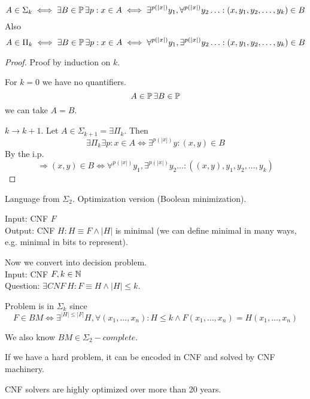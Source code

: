 \begin{definition}\label{ph_altern}
	\[ A \in \Sigma_k \iff \exists B \in \operatorname{\mathbb{P}} \exists p: x \in A \iff \exists^{p(|x|)} y_1, \forall^{p(|x|)} y_2 \ldots : (x, y_1, y_2, \ldots, y_k) \in B \]
	Also
	\[ A \in \Pi_k \iff \exists B \in \operatorname{\mathbb{P}} \exists p: x \in A \iff \forall^{p(|x|)} y_1, \exists^{p(|x|)} y_2 \ldots : (x, y_1, y_2, \ldots, y_k) \in B \]
\end{definition}
\begin{proof}
	Proof by induction on $k$.

	For $k = 0$ we have no quantifiers.
	\[ A \in \operatorname{\mathbb{P}} \exists B \in \operatorname{\mathbb{P}} \]
	we can take $A = B$.

	$k \to k + 1$. Let $A \in \Sigma_{k + 1} = \exists \Pi_k$.
	Then
	\[ \exists \Pi_k \exists p: x \in A \iff \exists^{p(|x|)} y: (x,y) \in B \]
	By the i.p.
	\[ \Rightarrow (x,y) \in B \iff \forall^{p(|x|)} y_1, \exists^{p(|x|)} y_2 \ldots : ((x,y), y_1, y_2, \ldots, y_k) \]
\end{proof}

\begin{example}
	Language from $\Sigma_2$.
	Optimization version (Boolean minimization).

	Input: CNF $F$\\
	Output: CNF $H: H \equiv F \land |H|$ is minimal (we can define minimal in many ways, e.g. minimal in bits to represent).

	Now we convert into decision problem.\\
	Input: CNF $F, k \in \operatorname{\mathbb{N}}$ \\
	Question: $\exists CNF\ H: F \equiv H \land |H| \leq k $.

	Problem is in $\Sigma_k$ since
	\[ F \in BM \iff \exists^{|H| \leq |F|} H, \forall (x_1, \ldots, x_n): H \leq k \land F(x_1, \ldots, x_n) = H(x_1, \ldots, x_n) \]

	We also know $BM \in \Sigma_2-complete$.
\end{example}

\begin{note}
	If we have a hard problem, it can be encoded in CNF and solved by CNF machinery.

	CNF solvers are highly optimized over more than 20 years.
\end{note}
